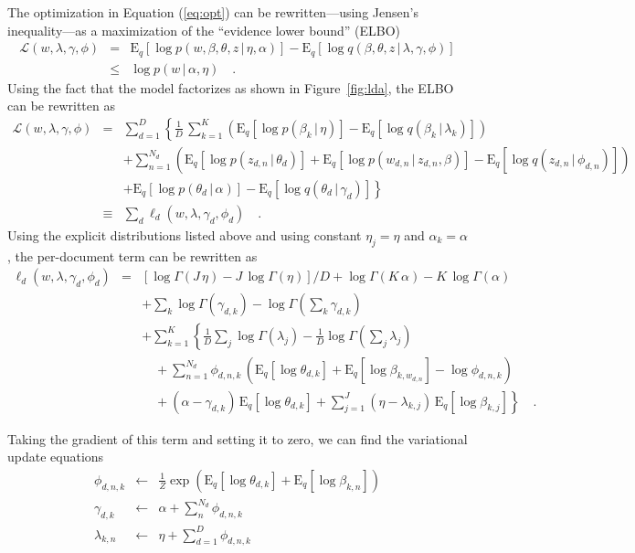 \documentclass[11pt]{article}
\newcommand{\eq}[1]{Equation (\ref{eq:#1})}
\newcommand{\fig}[1]{Figure~\ref{fig:#1}}
\newcommand{\expect}[2]{\ensuremath{\mathrm{E}_{#1}\left [ {#2} \right ]}}
\begin{document}
The optimization in \eq{opt} can be rewritten---using Jensen's inequality---as
a maximization of the ``evidence lower bound'' (ELBO)
\begin{eqnarray}
\mathcal{L}(w,\lambda,\gamma,\phi) &=&
\expect{q}{\log p(w,\beta,\theta,z\,|\,\eta,\alpha)}
- \expect{q}{\log q(\beta,\theta,z\,|\,\lambda,\gamma,\phi)} \\
&\le& \log p(w\,|\,\alpha,\eta) \quad.
\end{eqnarray}
Using the fact that the model factorizes as shown in \fig{lda}, the ELBO can
be rewritten as
\begin{eqnarray}
\mathcal{L}(w,\lambda,\gamma,\phi) &=&
    \sum_{d=1}^D\left \{ \frac{1}{D}\,\sum_{k=1}^K \left (
    \expect{q}{\log p(\beta_k\,|\,\eta)}
    -\expect{q}{\log q(\beta_k\,|\,\lambda_k)} \right )\right.
\nonumber\\ &&
    +\sum_{n=1}^{N_d} \left ( \expect{q}{\log p(z_{d,n}\,|\,\theta_d)}
    +\expect{q}{\log p(w_{d,n}\,|\,z_{d,n},\beta)}
    -\expect{q}{\log q(z_{d,n}\,|\,\phi_{d,n})} \right)
\nonumber\\ &&  \left.
    +\expect{q}{\log p(\theta_d\,|\,\alpha)}
    -\expect{q}{\log q(\theta_d\,|\,\gamma_d)}
\right \} \\
&\equiv& \sum_d \ell_d (w,\lambda,\gamma_d,\phi_d) \quad.
\end{eqnarray}
Using the explicit distributions listed above and using constant $\eta_j =
\eta$ and $\alpha_k = \alpha$, the per-document term can be rewritten as
\begin{eqnarray}
\ell_d (w,\lambda,\gamma_d,\phi_d) &=&
[\log\Gamma(J\,\eta)-J\,\log\Gamma(\eta)]/D +
\log\Gamma(K\,\alpha)-K\,\log\Gamma(\alpha)
\nonumber \\
&& +\sum_k\log\Gamma(\gamma_{d,k}) -
\log\Gamma\left(\sum_k \gamma_{d,k}\right)
\nonumber\\
&& +\sum_{k=1}^K\left\{\frac{1}{D}\sum_j \log\Gamma(\lambda_j) -
\frac{1}{D}\log\Gamma\left(\sum_j \lambda_j\right)
\right. \nonumber\\
&& \quad+\sum_{n=1}^{N_d} \phi_{d,n,k}\,\left(
\expect{q}{\log\theta_{d,k}} + \expect{q}{\log\beta_{k,w_{d,n}}}
-\log\phi_{d,n,k}
\right)
\nonumber\\
&& \quad+ (\alpha-\gamma_{d,k})\,\expect{q}{\log\theta_{d,k}} +
\left.\sum_{j=1}^J (\eta-\lambda_{k,j})\,\expect{q}{\log\beta_{k,j}}
\right\} \quad.
\end{eqnarray}

Taking the gradient of this term and setting it to zero, we can find the
variational update equations
\begin{eqnarray}
\phi_{d,n,k} &\gets& \frac{1}{Z} \exp \left(\expect{q}{\log\theta_{d,k}}
+\expect{q}{\log\beta_{k,n}}\right) \\
\gamma_{d,k} &\gets& \alpha + \sum_n^{N_d} \phi_{d,n,k} \\
\lambda_{k,n} &\gets& \eta + \sum_{d=1}^{D} \phi_{d,n,k}
\end{eqnarray}
\end{document}
